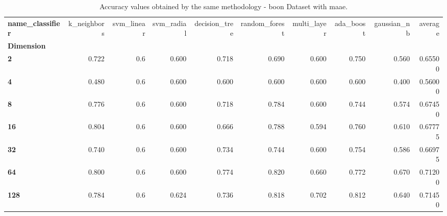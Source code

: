 \begin{table}
\centering
\caption{Accuracy values obtained by the same methodology - boon Dataset with maae.}
\label{accuracy_boon_maae-reproduction}
\begin{tabular}{lrrrrrrrrr}
\toprule
\textbf{name\_classifier} &  k\_neighbors &  svm\_linear &  svm\_radial &  decision\_tree &  random\_forest &  multi\_layer &  ada\_boost &  gaussian\_nb &  average \\
\textbf{Dimension} &              &             &             &                &                &              &            &              &          \\
\midrule
\textbf{2        } &        0.722 &         0.6 &       0.600 &          0.718 &          0.690 &        0.600 &      0.750 &        0.560 &  0.65500 \\
\textbf{4        } &        0.480 &         0.6 &       0.600 &          0.600 &          0.600 &        0.600 &      0.600 &        0.400 &  0.56000 \\
\textbf{8        } &        0.776 &         0.6 &       0.600 &          0.718 &          0.784 &        0.600 &      0.744 &        0.574 &  0.67450 \\
\textbf{16       } &        0.804 &         0.6 &       0.600 &          0.666 &          0.788 &        0.594 &      0.760 &        0.610 &  0.67775 \\
\textbf{32       } &        0.740 &         0.6 &       0.600 &          0.734 &          0.744 &        0.600 &      0.754 &        0.586 &  0.66975 \\
\textbf{64       } &        0.800 &         0.6 &       0.600 &          0.774 &          0.820 &        0.660 &      0.772 &        0.670 &  0.71200 \\
\textbf{128      } &        0.784 &         0.6 &       0.624 &          0.736 &          0.818 &        0.702 &      0.812 &        0.640 &  0.71450 \\
\bottomrule
\end{tabular}
\end{table}
